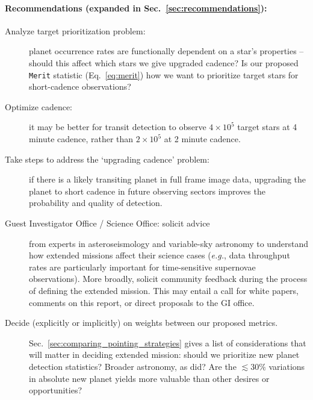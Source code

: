 \paragraph{Recommendations (expanded in Sec.~\ref{sec:recommendations}):}

\begin{description}
	\item[Analyze target prioritization problem:] planet occurrence rates are functionally dependent on a star's properties -- should this affect which stars we give upgraded cadence?
	Is our proposed \texttt{Merit} statistic (Eq.~\ref{eq:merit}) how we want to prioritize target stars for short-cadence observations?
	
	\item[Optimize cadence:] it may be better for transit detection to observe $4\times10^5$ target stars at 4 minute cadence, rather than $2\times10^5$ at 2 minute cadence.
	
	\item[Take steps to address the `upgrading cadence' problem:] 
	if there is a likely transiting planet in full frame image data, upgrading the planet to short cadence in future observing sectors improves the probability and quality of detection.
	
	\item[Guest Investigator Office / \tess Science Office: solicit advice]
	from experts in asteroseismology and variable-sky astronomy to understand how extended missions affect their science cases (\textit{e.g.}, data throughput rates are particularly important for time-sensitive supernovae observations).
	More broadly, solicit community feedback during the process of defining the extended mission.
	This may entail a call for white papers, comments on this report, or direct proposals to the GI office. 
	
	\item[Decide (explicitly or implicitly) on weights between our proposed metrics.]
	Sec.~\ref{sec:comparing_pointing_strategies} gives a list of considerations that will matter in deciding \tesss extended mission: should we prioritize new planet detection statistics? Broader astronomy, as \ktwo did?
	Are the $\lesssim30\%$ variations in absolute new planet yields more valuable than other desires or opportunities?
	

\end{description}
